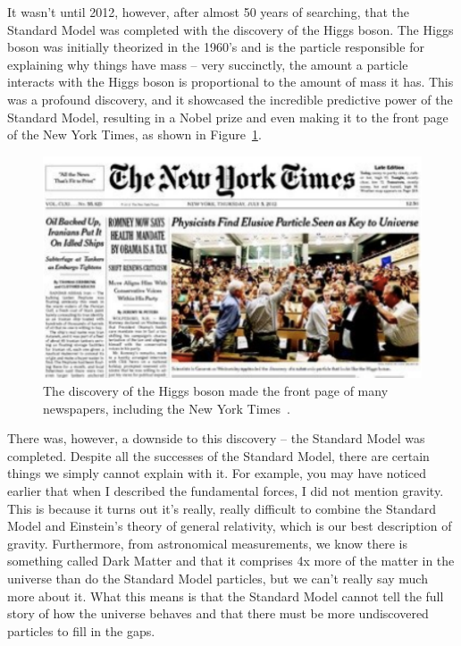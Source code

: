 It wasn't until 2012, however, after almost 50 years of searching, that the Standard Model was completed with the discovery of the Higgs boson.
The Higgs boson was initially theorized in the 1960's and is the particle responsible for explaining why things have mass -- very succinctly, the amount a particle interacts with the Higgs boson is proportional to the amount of mass it has.
This was a profound discovery, and it showcased the incredible predictive power of the Standard Model, resulting in a Nobel prize and even making it to the front page of the New York Times, as shown in Figure~\ref{fig:nyt_higgs}.

\begin{figure}[tbp!]
\begin{center}
\includegraphics[angle=0,width=0.60\columnwidth]{fig/nyt_higgs.pdf}
\end{center}
\caption{The discovery of the Higgs boson made the front page of many newspapers, including the New York Times~\cite{overbye_2012}.}
\label{fig:nyt_higgs}
\end{figure}

There was, however, a downside to this discovery -- the Standard Model was completed.
Despite all the successes of the Standard Model, there are certain things we simply cannot explain with it.
For example, you may have noticed earlier that when I described the fundamental forces, I did not mention gravity.
This is because it turns out it's really, really difficult to combine the Standard Model and Einstein's theory of general relativity, which is our best description of gravity.
Furthermore, from astronomical measurements, we know there is something called Dark Matter and that it comprises 4x more of the matter in the universe than do the Standard Model particles, but we can't really say much more about it.
What this means is that the Standard Model cannot tell the full story of how the universe behaves and that there must be more undiscovered particles to fill in the gaps.

